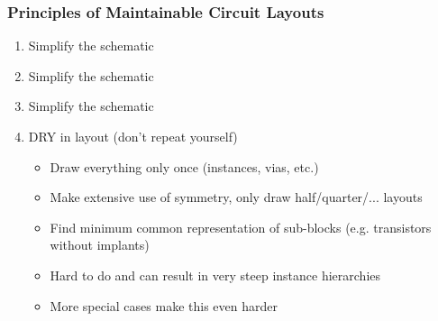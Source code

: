 \documentclass[aspectratio=169, dvipsnames, x11names, svgnames, 11pt]{beamer}
\begin{document}
\begin{frame}
    \frametitle{Principles of Maintainable Circuit Layouts}
    \begin{enumerate}
        \item Simplify the schematic
        \item Simplify the schematic
        \item Simplify the schematic
        \item DRY in layout (don't repeat yourself)
            \begin{itemize}
                \item Draw everything only once (instances, vias, etc.)
                \item Make extensive use of symmetry, only draw half/quarter/... layouts
                \item Find minimum common representation of sub-blocks (e.g. transistors without implants)
                \item Hard to do and can result in very steep instance hierarchies
                \item More special cases make this even harder
            \end{itemize}
    \end{enumerate}
\end{frame}

\end{document}
